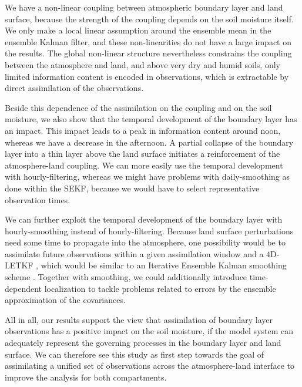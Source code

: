 \documentclass[HESSD, manuscript]{copernicus}
\begin{document}
We have a non-linear coupling between atmospheric boundary layer and land surface, because the strength of the coupling depends on the soil moisture itself.
We only make a local linear assumption around the ensemble mean in the ensemble Kalman filter, and these non-linearities do not have a large impact on the results.
The global non-linear structure nevertheless constrains the coupling between the atmosphere and land, and above very dry and humid soils, only limited information content is encoded in observations, which is extractable by direct assimilation of the observations.

Beside this dependence of the assimilation on the coupling and on the soil moisture, we also show that the temporal development of the boundary layer has an impact.
This impact leads to a peak in information content around noon, whereas we have a decrease in the afternoon.
A partial collapse of the boundary layer into a thin layer above the land surface initiates a reinforcement of the atmosphere-land coupling.
We can more easily use the temporal development with hourly-filtering, whereas we might have problems with daily-smoothing as done within the SEKF, because we would have to select representative observation times.

We can further exploit the temporal development of the boundary layer with hourly-smoothing instead of hourly-filtering.
Because land surface perturbations need some time to propagate into the atmosphere, one possibility would be to assimilate future observations within a given assimilation window and a 4D-LETKF \citep{harlim_four-dimensional_2007,kalnay_response_2007}, which would be similar to an Iterative Ensemble Kalman smoothing scheme \citep{kalnay_accelerating_2010, sakov_iterative_2012,bocquet_iterative_2014}.
Together with smoothing, we could additionally introduce time-dependent localization to tackle problems related to errors by the ensemble approximation of the covariances.

All in all, our results support the view that assimilation of boundary layer observations has a positive impact on the soil moisture, if the model system can adequately represent the governing processes in the boundary layer and land surface.
We can therefore see this study as first step towards the goal of assimilating a unified set of observations across the atmosphere-land interface to improve the analysis for both compartments.
\end{document}

